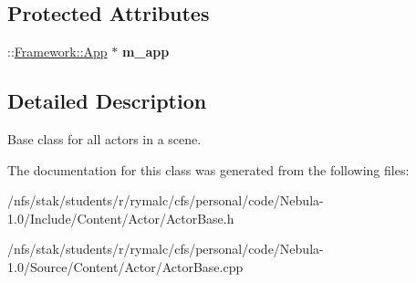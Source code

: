 \subsection*{Protected Attributes}
\begin{DoxyCompactItemize}
\item 
\hypertarget{classContent_1_1ActorBase_a7df46a039052d56e1697dba278ff8b9b}{
::\hyperlink{classFramework_1_1App}{Framework::App} $\ast$ {\bfseries m\_\-app}}
\label{classContent_1_1ActorBase_a7df46a039052d56e1697dba278ff8b9b}

\end{DoxyCompactItemize}


\subsection{Detailed Description}
Base class for all actors in a scene. 

The documentation for this class was generated from the following files:\begin{DoxyCompactItemize}
\item 
/nfs/stak/students/r/rymalc/cfs/personal/code/Nebula-\/1.0/Include/Content/Actor/ActorBase.h\item 
/nfs/stak/students/r/rymalc/cfs/personal/code/Nebula-\/1.0/Source/Content/Actor/ActorBase.cpp\end{DoxyCompactItemize}
